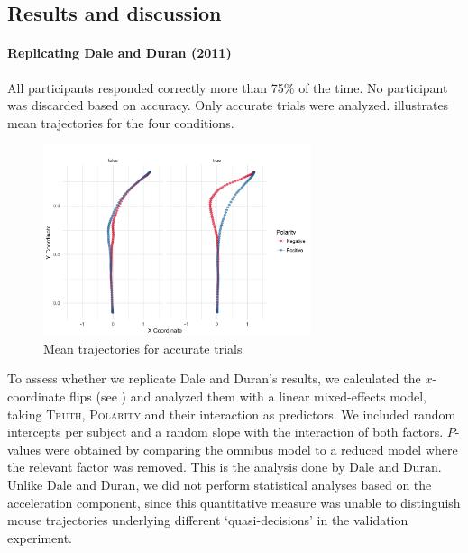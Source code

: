 \documentclass{article}
\begin{document}
\subsection{Results and discussion}
\paragraph{Replicating Dale and Duran (2011)}
All participants responded correctly more than 75\% of the time. No participant was discarded based on accuracy.  Only accurate trials were analyzed.  illustrates mean trajectories for the four conditions.
\begin{figure}
\centering
\includegraphics[width=0.7\textwidth]{negation-data-mean-trajectory.png}
\caption{Mean trajectories for accurate trials} \label{fig:mean.trajectory-negation}
\end{figure}

To assess whether we replicate Dale and Duran's results, we calculated the $x$-coordinate flips (see ) and analyzed them with a linear mixed-effects model, taking \textsc{Truth}, \textsc{Polarity} and their interaction as predictors. We included random intercepts per subject and a random slope with the interaction of both factors. $P$-values were obtained by comparing the omnibus model to a reduced model where the relevant factor was removed. This is the analysis done by Dale and Duran. 
Unlike Dale and Duran, we did not perform statistical analyses based on the acceleration component, since this quantitative measure was unable to distinguish mouse trajectories underlying different `quasi-decisions' in the validation experiment.

\end{document}
